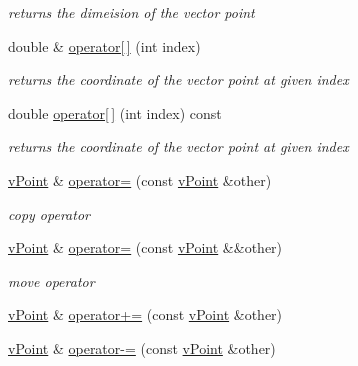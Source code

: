 \begin{DoxyCompactItemize}
\begin{DoxyCompactList}\small\item\em returns the dimeision of the vector point \end{DoxyCompactList}\item 
\mbox{\label{classv_point_a72b0e383d2557164b7b859c70e4d2648}} 
double \& \hyperlink{classv_point_a72b0e383d2557164b7b859c70e4d2648}{operator\mbox{[}$\,$\mbox{]}} (int index)
\begin{DoxyCompactList}\small\item\em returns the coordinate of the vector point at given index \end{DoxyCompactList}\item 
\mbox{\label{classv_point_a6618a9c75691efbf3c034c3f3d09697d}} 
double \hyperlink{classv_point_a6618a9c75691efbf3c034c3f3d09697d}{operator\mbox{[}$\,$\mbox{]}} (int index) const
\begin{DoxyCompactList}\small\item\em returns the coordinate of the vector point at given index \end{DoxyCompactList}\item 
\mbox{\label{classv_point_a93b3a66529a00011797a07b8084fd062}} 
\hyperlink{classv_point}{v\+Point} \& \hyperlink{classv_point_a93b3a66529a00011797a07b8084fd062}{operator=} (const \hyperlink{classv_point}{v\+Point} \&other)
\begin{DoxyCompactList}\small\item\em copy operator \end{DoxyCompactList}\item 
\mbox{\label{classv_point_ab8419b418380071ae7b45293014991bf}} 
\hyperlink{classv_point}{v\+Point} \& \hyperlink{classv_point_ab8419b418380071ae7b45293014991bf}{operator=} (const \hyperlink{classv_point}{v\+Point} \&\&other)
\begin{DoxyCompactList}\small\item\em move operator \end{DoxyCompactList}\item 
\hyperlink{classv_point}{v\+Point} \& \hyperlink{classv_point_ad0a97769619fe728547c474f856bbd66}{operator+=} (const \hyperlink{classv_point}{v\+Point} \&other)
\item 
\hyperlink{classv_point}{v\+Point} \& \hyperlink{classv_point_a3497af6c905c256e25fda5e0815bef56}{operator-\/=} (const \hyperlink{classv_point}{v\+Point} \&other)

\end{DoxyCompactItemize}

